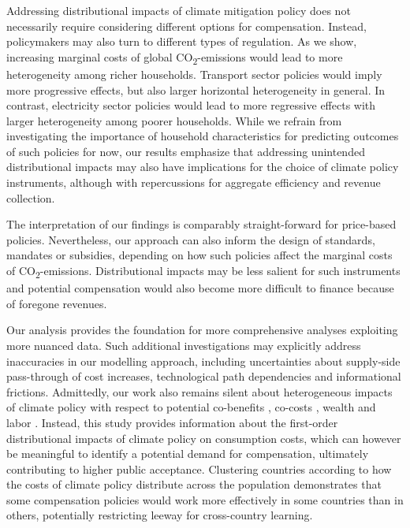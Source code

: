 \documentclass[12pt, a4paper]{article}
\begin{document}
Addressing distributional impacts of climate mitigation policy does not necessarily require considering different options for compensation. Instead, policymakers may also turn to different types of regulation. As we show, increasing marginal costs of global CO\textsubscript{2}-emissions would lead to more heterogeneity among richer households. Transport sector policies would imply more progressive effects, but also larger horizontal heterogeneity in general. In contrast, electricity sector policies would lead to more regressive effects with larger heterogeneity among poorer households. While we refrain from investigating the importance of household characteristics for predicting outcomes of such policies for now, our results emphasize that addressing unintended distributional impacts may also have implications for the choice of climate policy instruments, although with repercussions for aggregate efficiency and revenue collection. 

The interpretation of our findings is comparably straight-forward for price-based policies. Nevertheless, our approach can also inform the design of standards, mandates or subsidies, depending on how such policies affect the marginal costs of CO\textsubscript{2}-emissions. Distributional impacts may be less salient for such instruments and potential compensation would also become more difficult to finance because of foregone revenues. %

Our analysis provides the foundation for more comprehensive analyses exploiting more nuanced data. Such additional investigations may explicitly address inaccuracies in our modelling approach, including uncertainties about supply-side pass-through of cost increases, technological path dependencies and informational frictions. Admittedly, our work also remains silent about heterogeneous impacts of climate policy with respect to potential co-benefits \autocite[e.g.,][]{Holland.2019,Karlsson.2020}, co-costs \autocite[e.g.,][]{Fuje.2019,Greve.2022}, wealth \autocite[e.g.,][]{Fullerton.2011} and labor \autocite[e.g.,][]{Castellanos.2024}. Instead, this study provides information about the first-order distributional impacts of climate policy on consumption costs, which can however be meaningful to identify a potential demand for compensation, ultimately contributing to higher public acceptance. Clustering countries according to how the costs of climate policy distribute across the population demonstrates that some compensation policies would work more effectively in some countries than in others, potentially restricting leeway for cross-country learning. %
\end{document}
